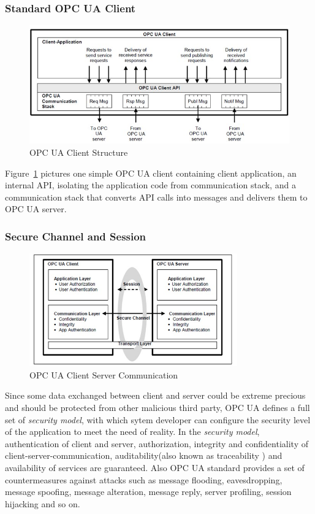 \documentclass[]{llncs}
\begin{document}
\subsubsection{Standard OPC UA Client}
\begin{figure}[!htbp]
	\centering
	\includegraphics[width=1.0\textwidth]{client.jpg}
		\caption[ ]{OPC UA Client Structure\cite{O1}}
	\label{fig:client}
\end{figure}

Figure~\ref{fig:client} pictures one simple OPC UA client containing client application, an internal API, isolating the application code from communication stack, and a communication stack that converts API calls into messages and delivers them to OPC UA server.

\subsubsection{Secure Channel and Session}

\begin{figure}[!htbp]
	\centering
	\includegraphics[width=0.8\textwidth]{opc_ua_cs_comm.jpg}
		\caption[ ]{OPC UA Client Server Communication\cite{O2}}
	\label{fig:opc_ua_cs_comm}
\end{figure}

Since some data exchanged between client and server could be extreme precious and should be protected from other malicious third party, OPC UA defines a full set of  \emph{security model}, with which sytem developer can configure the security level of the application to meet the need of reality. In the \emph{security model}, authentication of client and server, authorization, integrity and confidentiality of client-server-communication, auditability(also known as traceability ) and availability of services are guaranteed. Also OPC UA  standard provides a set of countermeasures against attacks such as message flooding, eavesdropping, message spoofing, message alteration, message reply, server profiling, session hijacking and so on\cite{O2}.
\end{document}
